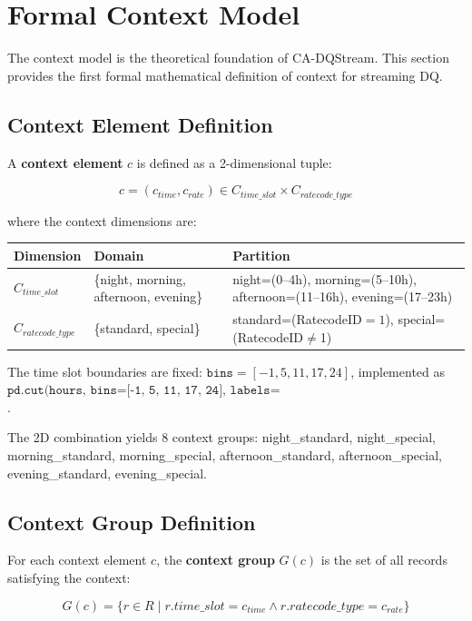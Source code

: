 \section{Formal Context Model}

The context model is the theoretical foundation of CA-DQStream. This section provides the first formal mathematical definition of context for streaming DQ.

\subsection{Context Element Definition}

A \textbf{context element} $c$ is defined as a 2-dimensional tuple:

\begin{equation}
c = (c_{time}, c_{rate}) \in C_{time\_slot} \times C_{ratecode\_type}
\end{equation}

where the context dimensions are:

\begin{longtable}{|m{3cm}|m{5cm}|m{5.5cm}|}
\hline
\textbf{Dimension} & \textbf{Domain} & \textbf{Partition} \\ \hline
$C_{time\_slot}$ & \{night, morning, afternoon, evening\} & night=(0--4h), morning=(5--10h), afternoon=(11--16h), evening=(17--23h) \\ \hline
$C_{ratecode\_type}$ & \{standard, special\} & standard=(RatecodeID$=1$), special=(RatecodeID$\neq$1) \\ \hline
\end{longtable}

The time slot boundaries are fixed: $\texttt{bins} = [-1, 5, 11, 17, 24]$, implemented as $\texttt{pd.cut(hours, bins=[-1, 5, 11, 17, 24], labels=['night','morning','afternoon','evening'])}$.

The 2D combination yields 8 context groups: night\_standard, night\_special, morning\_standard, morning\_special, afternoon\_standard, afternoon\_special, evening\_standard, evening\_special.

\subsection{Context Group Definition}

For each context element $c$, the \textbf{context group} $G(c)$ is the set of all records satisfying the context:

\begin{equation}
G(c) = \{ r \in R \mid r.time\_slot = c_{time} \land r.ratecode\_type = c_{rate} \}
\end{equation}

